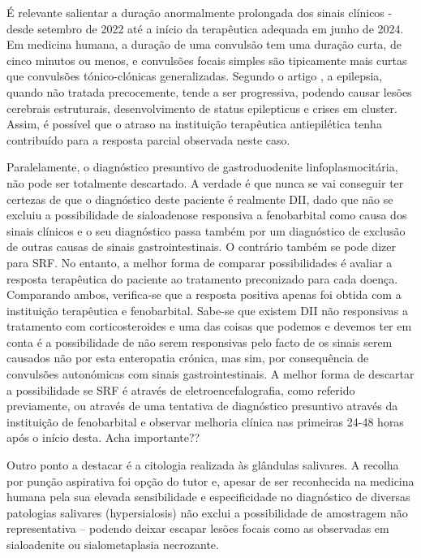 É relevante salientar a duração anormalmente prolongada dos sinais clínicos - desde setembro de 2022 até a início da terapêutica adequada em junho de 2024. Em medicina humana, a duração de uma convulsão tem uma duração curta, de cinco minutos ou menos, e convulsões focais simples são tipicamente mais curtas que convulsões tónico-clónicas generalizadas. \cite{Diop2025}  Segundo o artigo \cite{Diop2025}, a epilepsia, quando não tratada precocemente, tende a ser progressiva, podendo causar lesões cerebrais estruturais, desenvolvimento de status epilepticus e crises em cluster. \cite{Diop2025}  Assim, é possível que o atraso na instituição terapêutica antiepilética tenha contribuído para a resposta parcial observada neste caso.


Paralelamente, o diagnóstico presuntivo de gastroduodenite linfoplasmocitária, não pode ser totalmente descartado. A verdade é que nunca se vai conseguir ter certezas de que o diagnóstico deste paciente é realmente DII, dado que não se excluiu a possibilidade de sialoadenose responsiva a fenobarbital como causa dos sinais clínicos e o seu diagnóstico passa também por um diagnóstico de exclusão de outras causas de sinais gastrointestinais. O contrário também se pode dizer para SRF. No entanto, a melhor forma de comparar possibilidades é avaliar a resposta terapêutica do paciente ao tratamento preconizado para cada doença. Comparando ambos, verifica-se que a resposta positiva apenas foi obtida com a instituição terapêutica e fenobarbital. Sabe-se que existem DII não responsivas a tratamento com corticosteroides e uma das coisas que podemos e devemos ter em conta é a possibilidade de não serem responsivas pelo facto de os sinais serem causados não por esta enteropatia crónica, mas sim, por consequência de convulsões autonómicas com sinais gastrointestinais. A melhor forma de descartar a possibilidade se SRF é através de eletroencefalografia, como referido previamente, ou através de uma tentativa de diagnóstico presuntivo através da instituição de fenobarbital e observar melhoria clínica nas primeiras 24-48 horas após o início desta. Acha importante??


Outro ponto a destacar é a citologia realizada às glândulas salivares. A recolha por punção aspirativa foi opção do tutor e, apesar de ser reconhecida na medicina humana pela sua elevada sensibilidade e especificidade no diagnóstico de diversas patologias salivares (hypersialosis) não exclui a possibilidade de amostragem não representativa – podendo deixar escapar lesões focais como as observadas em sialoadenite ou sialometaplasia necrozante.


